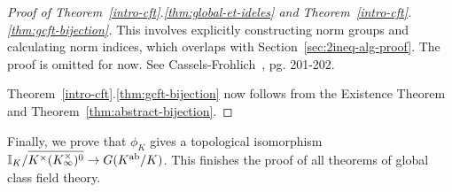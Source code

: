 \begin{proof}[Proof of Theorem~\ref{intro-cft}.\ref{thm:global-et-ideles} and Theorem~\ref{intro-cft}.\ref{thm:gcft-bijection}]
This involves explicitly constructing norm groups and calculating norm indices, which overlaps with Section~\ref{sec:2ineq-alg-proof}. The proof is omitted for now. See Cassels-Frohlich~\cite{CF69}, pg. 201-202.

Theorem~\ref{intro-cft}.\ref{thm:gcft-bijection} now follows from the Existence Theorem and Theorem~\ref{thm:abstract-bijection}.
\end{proof}
Finally, we prove that $\phi_K$ gives a topological isomorphism  $\mathbb{I}_K/\overline{K^{\times}(K_{\infty}^{\times})^0}\to G(K^{\text{ab}}/K)$. This finishes the proof of all theorems of global class field theory.
